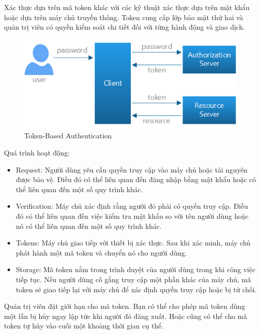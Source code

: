 Xác thực dựa trên mã token khác với các kỹ thuật xác thực dựa trên mật khẩu hoặc dựa trên máy chủ truyền thống. Token cung cấp lớp bảo mật thứ hai và quản trị viên có quyền kiểm soát chi tiết đối với từng hành động và giao dịch.\par

\begin{figure}[h!]
    \begin{center}
        \includegraphics[width=12cm]{Image/Technical/token_auth.png}
        \caption{Token-Based Authentication}
        \label{TokenAuth}
    \end{center}
\end{figure}

Quá trình hoạt động:
\begin{itemize}
    \item Request: Người dùng yêu cầu quyền truy cập vào máy chủ hoặc tài nguyên được bảo vệ. Điều đó có thể liên quan đến đăng nhập bằng mật khẩu hoặc có thể liên quan đến một số quy trình khác.
    \item Verification: Máy chủ xác định rằng người đó phải có quyền truy cập. Điều đó có thể liên quan đến việc kiểm tra mật khẩu so với tên người dùng hoặc nó có thể liên quan đến một số quy trình khác.
    \item Tokens: Máy chủ giao tiếp với thiết bị xác thực. Sau khi xác minh, máy chủ phát hành một mã token và chuyển nó cho người dùng.
    \item Storage: Mã token nằm trong trình duyệt của người dùng trong khi công việc tiếp tục. Nếu người dùng cố gắng truy cập một phần khác của máy chủ, mã token sẽ giao tiếp lại với máy chủ để xác định quyền truy cập hoặc bị từ chối.
\end{itemize}
Quản trị viên đặt giới hạn cho mã token. Bạn có thể cho phép mã token dùng một lần bị hủy ngay lập tức khi người đó đăng xuất. Hoặc cũng có thể cho mã token tự hủy vào cuối một khoảng thời gian cụ thể.